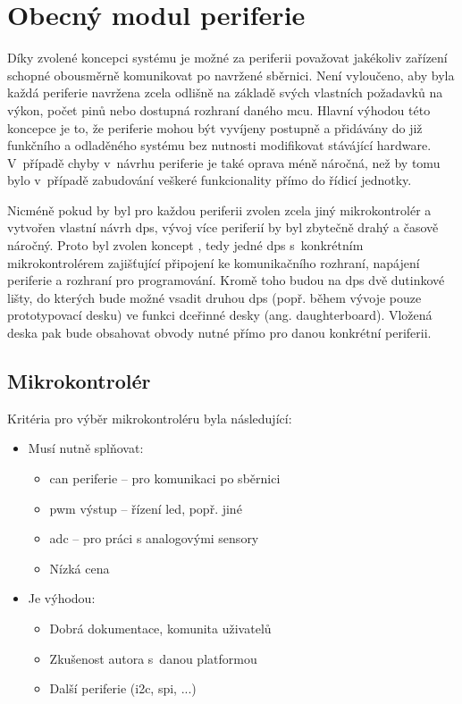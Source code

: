 \chapter{Obecný modul periferie}
\label{sec:modul-periferie}
    Díky zvolené koncepci systému je možné za periferii považovat jakékoliv zařízení schopné obousměrně komunikovat po navržené sběrnici. Není vyloučeno, aby byla každá periferie navržena zcela odlišně na základě svých vlastních požadavků na výkon, počet pinů nebo dostupná rozhraní daného \acs{mcu}. Hlavní výhodou této koncepce je to, že periferie mohou být vyvíjeny postupně a přidávány do již funkčního a odladěného systému bez nutnosti modifikovat stávájící hardware. V~případě chyby v~návrhu periferie je také oprava méně náročná, než by tomu bylo v~případě zabudování veškeré funkcionality přímo do řídicí jednotky. 

    Nicméně pokud by byl pro každou periferii zvolen zcela jiný mikrokontrolér a vytvořen vlastní návrh \acs{dps}, vývoj více periferií by byl zbytečně drahý a časově náročný. Proto byl zvolen koncept , tedy jedné \acs{dps} s~konkrétním mikrokontrolérem zajišťující připojení ke komunikačního rozhraní, napájení periferie a rozhraní pro programování. Kromě toho budou na \acs{dps} dvě dutinkové lišty, do kterých bude možné vsadit druhou \acs{dps} (popř. během vývoje pouze prototypovací desku) ve funkci dceřinné desky (ang. daughterboard). Vložená deska pak bude obsahovat obvody nutné přímo pro danou konkrétní periferii.
    
    \section{Mikrokontrolér}

        Kritéria pro výběr mikrokontroléru byla následující:
        \begin{itemize}
            \item Musí nutně splňovat:
            \begin{itemize}
                \item \acs{can} periferie -- pro komunikaci po sběrnici 
                \item \acs{pwm} výstup -- řízení \acs{led}, popř. jiné
                \item \acs{adc} -- pro práci s analogovými sensory
                \item Nízká cena 
            \end{itemize}
            \item Je výhodou:
            \begin{itemize}
                \item Dobrá dokumentace, komunita uživatelů
                \item Zkušenost autora s~danou platformou
                \item Další periferie (\acs{i2c}, \acs{spi}, ...)
            \end{itemize}
        \end{itemize}

